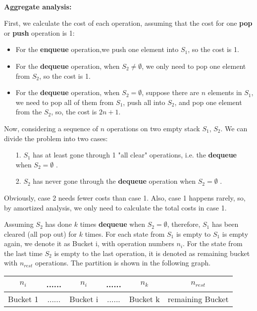 \documentclass[12pt,a4paper]{article}
\makeatletter
\newtheorem*{solution}{Solution}
\theoremstyle{definition}
\renewenvironment{solution}[1][Solution] {\par\pushQED{\qed}\normalfont\topsep6\p@\@plus6\p@\relax\trivlist\item[\hskip\labelsep\bfseries#1\@addpunct{.}]\ignorespaces}{\popQED\endtrivlist\@endpefalse} \makeatother
\makeatother
\begin{document}
\begin{solution}
~\\
\textbf{	Aggregate analysis:}

	First, we calculate the cost of each operation, assuming that the cost for one \textbf{pop} or \textbf{push} operation is 1:
	\begin{itemize}
	\item For the \textbf{enqueue} operation,we push one element into $S_1$, so the cost is 1.
	
	\item For the \textbf{dequeue} operation, when $S_2 \neq \emptyset$, we only need to pop one element from  $S_2$, so the cost is 1.
	
	\item For the \textbf{dequeue} operation, when $S_2 = \emptyset$, suppose there are $n$ elements in $S_1$, we need to pop all of them from $S_1$, push all into $S_2$, and pop one element from the $S_2$, so, the cost is $2n+1$.
	\end{itemize}
	
	Now, considering a sequence of $n$ operations on two empty stack $S_1$, $S_2$. We can divide the problem into two cases:
		\begin{itemize}
			\item[1.] $S_1$ has at least gone through 1 "all clear" operations, i.e. the \textbf{dequeue} when $S_2 = \emptyset$ .
			\item[2.] $S_2$ has never gone through  the \textbf{dequeue} operation when $S_2 = \emptyset$ .
		\end{itemize}
	
	Obviously, case 2 needs fewer costs than case 1. Also, case 1 happens rarely, so, by amortized analysis, we only need to calculate the total costs in case 1.
	
	Assuming $S_2$  has done $k$ times \textbf{dequeue} when $S_2 = \emptyset$, therefore, $S_1$ has been cleared  (all pop out) for $k$ times. For each state from
	$S_1$ is empty to $S_1$ is empty again, we denote it as Bucket i, with operation numbers $n_i$. For the state from the last time $S_2$ is empty to the last operation, it is denoted as remaining bucket with $n_{rest}$ operations.  The partition is shown in the following graph.
	\begin{table}[ht]
		\centering
		\begin{tabular}{|c|c|c|c|c|c|}
			\hline
			
			$n_i$ & ...... & $n_i$ & ...... & $n_k$ & $n_{rest}$ \\ \hline
			Bucket 1 &......  & Bucket i & ...... & Bucket k & remaining Bucket  \\ \hline
			

\end{tabular}
\end{table}
\end{solution}
\end{document}
